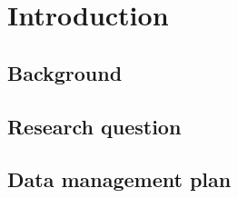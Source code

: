 \chapter{Introduction}
\label{p1:intro}
\section{Background}

\section{Research question}

\section{Data management plan}
